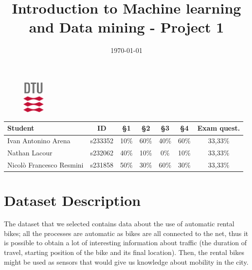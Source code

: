 \documentclass[11pt,a4paper]{article}
\begin{document}
 



\title{Introduction to Machine learning and Data mining - Project 1} %


\begin{figure}
    \centering
    \includegraphics[width=0.1\textwidth]{res/dtu_logo.png}
\end{figure}

 
\date{\today}

\maketitle
\begin{table}
\centering
\begin{tabular}{|l|c|c|c|c|c|c|}
 \hline
 \textbf{Student} & \textbf{ID} & \textbf{§1} & \textbf{§2} & \textbf{§3} & \textbf{§4} & \textbf{Exam quest.} \\
 \hline
 Ivan Antonino Arena & s233352 & 10\%  & 60\%  & 40\%  & 60\% & 33,33\%  \\
 \hline
 Nathan Lacour & s232062 & 40\%  & 10\%  & 0\%  & 10\%  & 33,33\%  \\
 \hline
 Nicolò Francesco Resmini & s231858 & 50\% & 30\%  & 60\%  & 30\%  & 33,33\% \\
 \hline
\end{tabular}
\end{table}


\pagebreak
\tableofcontents

\pagebreak

\section{Dataset Description}

The dataset that we selected contains data about the use of automatic rental bikes; all the processes are automatic as bikes are all connected to the net, thus it is possible to obtain a lot of interesting information about traffic (the duration of travel, starting position of the bike and its final location). Then, the rental bikes might be used as sensors that would give us knowledge about mobility in the city.
\end{document}
